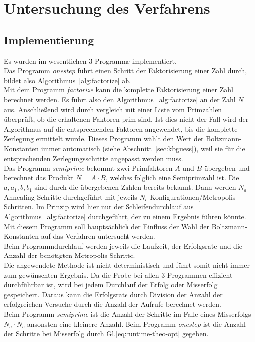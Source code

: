 \chapter{Untersuchung des Verfahrens}\label{ch:results}

\section{Implementierung}
Es wurden im wesentlichen $3$ Programme implementiert.  \\
Das Programm \textit{onestep} führt einen Schritt der Faktorisierung einer Zahl durch, bildet also Algorithmus~\ref{alg:factorize} ab. \\
Mit dem Programm \textit{factorize} kann die komplette Faktorisierung einer Zahl berechnet werden. Es führt also den Algorithmus~\ref{alg:factorize} an der Zahl $N$ aus. Anschließend wird durch vergleich mit einer Liste vom Primzahlen überprüft, ob die erhaltenen Faktoren prim sind. Ist dies nicht der Fall wird der Algorithmus auf die entsprechenden Faktoren angewendet, bis die komplette Zerlegung ermittelt wurde. Dieses Programm wählt den Wert der Boltzmann-Konstanten immer automatisch (siehe Abschnitt~\ref{sec:kbguess}), weil sie für die entsprechenden Zerlegungsschritte angepasst werden muss.\\
Das Programm \textit{semiprime} bekommt zwei Primfaktoren $A$ und $B$ übergeben und berechnet das Produkt $N=A\cdot B$, welches folglich eine Semiprimzahl ist. Die $a, a_1, b, b_1$ sind durch die übergebenen Zahlen bereits bekannt. Dann werden $N_a$ Annealing-Schritte durchgeführt mit jeweils $N_c$ Konfigurationen/Metropolis-Schritten. Im Prinzip wird hier nur der Schleifendurchlauf aus Algorithmus~\ref{alg:factorize} durchgeführt, der zu einem Ergebnis führen könnte. Mit diesem Programm soll hauptsächlich der Einfluss der Wahl der Boltzmann-Konstanten auf das Verfahren untersucht werden. \\
Beim Programmdurchlauf werden jeweils die Laufzeit, der Erfolgsrate und die Anzahl der benötigten Metropolis-Schritte. \\
Die angewendete Methode ist nicht-deterministisch und führt somit nicht immer zum gewünschten Ergebnis. Da die Probe bei allen $3$ Programmen effizient durchführbar ist, wird bei jedem Durchlauf der Erfolg oder Misserfolg gespeichert. Daraus kann die Erfolgsrate durch Division der Anzahl der erfolgreichen Versuche durch die Anzahl der Aufrufe berechnet werden. \\
Beim Programm \textit{semiprime} ist die Anzahl der Schritte im Falle eines Misserfolgs $N_a\cdot N_c$ ansonsten eine kleinere Anzahl. Beim Programm \textit{onestep} ist die Anzahl der Schritte bei Misserfolg durch Gl.\eqref{eq:runtime-theo-opt} gegeben.\\
